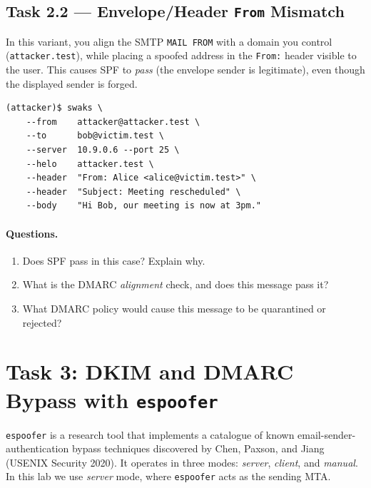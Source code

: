 \documentclass[11pt]{article}
\begin{document}
\subsection{Task 2.2 --- Envelope/Header \texttt{From} Mismatch}

In this variant, you align the SMTP \texttt{MAIL FROM} with a domain
you control (\texttt{attacker.test}), while placing a spoofed address
in the \texttt{From:} header visible to the user.
This causes SPF to \emph{pass} (the envelope sender is legitimate),
even though the displayed sender is forged.

\begin{listing}[H]
\begin{verbatim}
(attacker)$ swaks \
    --from    attacker@attacker.test \
    --to      bob@victim.test \
    --server  10.9.0.6 --port 25 \
    --helo    attacker.test \
    --header  "From: Alice <alice@victim.test>" \
    --header  "Subject: Meeting rescheduled" \
    --body    "Hi Bob, our meeting is now at 3pm."
\end{verbatim}
\end{listing}

\paragraph{Questions.}
\begin{enumerate}[noitemsep]
  \item Does SPF pass in this case?  Explain why.
  \item What is the DMARC \emph{alignment} check, and does this message
    pass it?
  \item What DMARC policy would cause this message to be quarantined or
    rejected?
\end{enumerate}

\section{Task 3: DKIM and DMARC Bypass with \texttt{espoofer}}

\texttt{espoofer} is a research tool that implements a catalogue of
known email-sender-authentication bypass techniques discovered by Chen,
Paxson, and Jiang (USENIX Security 2020).
It operates in three modes: \textit{server}, \textit{client}, and
\textit{manual}.
In this lab we use \textit{server} mode, where \texttt{espoofer} acts
as the sending MTA.
\end{document}
